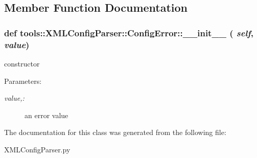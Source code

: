 \subsection{Member Function Documentation}
\hypertarget{classtools_1_1XMLConfigParser_1_1ConfigError_70c57c0779ed34d7057a24cf494bb1a5}{
\subsubsection{\setlength{\rightskip}{0pt plus 5cm}def tools::XMLConfigParser::ConfigError::\_\-\_\-init\_\-\_\- ( {\em self}, \/   {\em value})}}
\label{classtools_1_1XMLConfigParser_1_1ConfigError_70c57c0779ed34d7057a24cf494bb1a5}


constructor 

\begin{Desc}
\item[Parameters:]
\begin{description}
\item[{\em value,:}]an error value \end{description}
\end{Desc}


The documentation for this class was generated from the following file:\begin{CompactItemize}
\item 
XMLConfigParser.py\end{CompactItemize}
